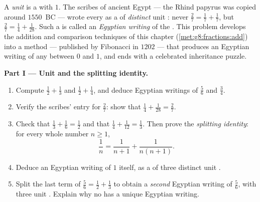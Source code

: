 \begin{problem}
\label{pb:g8:fractions:1}
A \emph{unit } is a  with  $1$. The
scribes of ancient Egypt --- the Rhind papyrus was copied around
$1550$~BC --- wrote every  as a  of \emph{distinct}
unit : never $\frac27 = \frac17 + \frac17$, but
$\frac27 = \frac14 + \frac{1}{28}$. Such a  is called an
\emph{Egyptian writing} of the . This problem develops the
addition and comparison techniques of this chapter
(\cref{met:g8:fractions:add}) into a method --- published by
Fibonacci in $1202$ --- that produces an Egyptian writing of any
 between $0$ and $1$, and ends with a celebrated
inheritance puzzle.

\medskip
\noindent\textbf{Part I --- Unit  and the splitting
identity.}
\begin{enumerate}
  \item Compute $\frac12 + \frac13$ and $\frac12 + \frac14$, and
        deduce Egyptian writings of $\frac56$ and $\frac34$.
  \item Verify the scribes' entry for $\frac27$: show that
        $\frac14 + \frac{1}{28} = \frac27$.
  \item Check that $\frac13 + \frac16 = \frac12$ and that
        $\frac14 + \frac{1}{12} = \frac13$. Then prove the
        \emph{splitting identity}: for every whole number
        $n \geq 1$,
        \[
        \frac{1}{n} = \frac{1}{n+1} + \frac{1}{n(n+1)} .
        \]
  \item Deduce an Egyptian writing of $1$ itself, as a  of
        three distinct unit .
  \item Split the last term of $\frac56 = \frac12 + \frac13$ to
        obtain a \emph{second} Egyptian writing of $\frac56$, with
        three unit . Explain why no  has a unique
        Egyptian writing.
\end{enumerate}


\end{problem}
